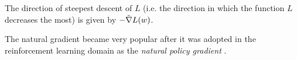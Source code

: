
\begin{theorem}[Amari]
The direction of steepest descent of \(L\) (i.e. the direction in which the function \(L\) decreases the most) is given by \(-\Tilde{\nabla} L (w)\).
\end{theorem}


The natural gradient became very popular after it was adopted in the reinforcement learning domain as the \emph{natural policy gradient} \cite{Kakade2001}.


